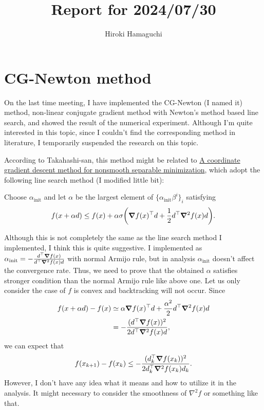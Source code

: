 \documentclass[\main/include]{subfiles}
\begin{document}
\title{Report for 2024/07/30}
\author{Hiroki Hamaguchi}
\maketitle

\section{CG-Newton method}

On the last time meeting, I have implemented the CG-Newton (I named it) method, non-linear conjugate gradient method with Newton's method based line search, and showed the result of the numerical experiment.
Although I'm quite interested in this topic, since I couldn't find the corresponding method in literature, I temporarily suspended the research on this topic.

According to Takahashi-san, this method might be related to \href{https://link-springer-com.utokyo.idm.oclc.org/article/10.1007/s10107-007-0170-0}{A coordinate gradient descent method for nonsmooth separable minimization}, which adopt the following line search method (I modified little bit):
\begin{screen}
  Choose $\alpha_{\mathrm{init}}$ and let $\alpha$ be the largest element of $\{ \alpha_{\mathrm{init}} \beta^i \}_{i}$ satisfying
  \begin{equation*}
    f(x+\alpha d) \leq f(x) + \alpha \sigma \qty(\grad f(x)^\top d+ \frac{1}{2} d^\top \grad^2 f(x) d).
  \end{equation*}
\end{screen}
Although this is not completely the same as the line search method I implemented, I think this is quite suggestive.
I implemented as $\alpha_{\mathrm{init}} = -\frac{d^\top \grad f(x)}{d^\top \grad^2 f(x) d}$ with normal Armijo rule, but in analysis $\alpha_{\mathrm{init}}$ doesn't affect the convergence rate. Thus, we need to prove that the obtained $\alpha$ satisfies stronger condition than the normal Armijo rule like above one.
Let us only consider the case of $f$ is convex and backtracking will not occur. Since
\begin{align*}
  f(x+\alpha d) - f(x) & \simeq \alpha \grad f(x)^\top d + \frac{\alpha^2}{2} d^\top \grad^2 f(x) d \\
                       & = -\frac{(d^\top \grad f(x))^2}{2d^\top \grad^2 f(x) d},
\end{align*}
we can expect that
\begin{equation*}
  f(x_{k+1}) - f(x_k) \leq -\frac{(d_k^\top \grad f(x_k))^2}{2d_k^\top \grad^2 f(x_k) d_k}.
\end{equation*}
However, I don't have any idea what it means and how to utilize it in the analysis.
It might necessary to consider the smoothness of $\nabla^2 f$ or something like that.
\end{document}
